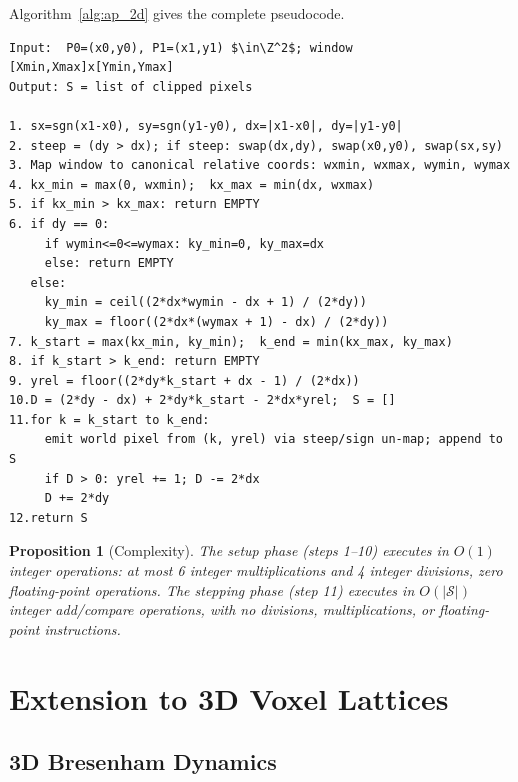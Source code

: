 \documentclass[12pt,a4paper]{article}
\newtheorem{proposition}[theorem]{Proposition}
\theoremstyle{definition}
\newcommand{\Z}{\mathbb{Z}}
\begin{document}
Algorithm~\ref{alg:ap_2d} gives the complete pseudocode.

\begin{algorithm}[tb]
\caption{AP-Bresenham 2D Line Clipping}
\label{alg:ap_2d}
\begin{lstlisting}[style=pseudo,caption={}]
Input:  P0=(x0,y0), P1=(x1,y1) $\in\Z^2$; window [Xmin,Xmax]x[Ymin,Ymax]
Output: S = list of clipped pixels

1. sx=sgn(x1-x0), sy=sgn(y1-y0), dx=|x1-x0|, dy=|y1-y0|
2. steep = (dy > dx); if steep: swap(dx,dy), swap(x0,y0), swap(sx,sy)
3. Map window to canonical relative coords: wxmin, wxmax, wymin, wymax
4. kx_min = max(0, wxmin);  kx_max = min(dx, wxmax)
5. if kx_min > kx_max: return EMPTY
6. if dy == 0:
     if wymin<=0<=wymax: ky_min=0, ky_max=dx
     else: return EMPTY
   else:
     ky_min = ceil((2*dx*wymin - dx + 1) / (2*dy))
     ky_max = floor((2*dx*(wymax + 1) - dx) / (2*dy))
7. k_start = max(kx_min, ky_min);  k_end = min(kx_max, ky_max)
8. if k_start > k_end: return EMPTY
9. yrel = floor((2*dy*k_start + dx - 1) / (2*dx))
10.D = (2*dy - dx) + 2*dy*k_start - 2*dx*yrel;  S = []
11.for k = k_start to k_end:
     emit world pixel from (k, yrel) via steep/sign un-map; append to S
     if D > 0: yrel += 1; D -= 2*dx
     D += 2*dy
12.return S
\end{lstlisting}
\end{algorithm}

\begin{proposition}[Complexity]
The setup phase (steps 1--10) executes in $O(1)$ integer
operations: at most 6 integer multiplications and 4 integer
divisions, zero floating-point operations. The stepping
phase (step 11) executes in $O(|\mathcal{S}|)$ integer
add/compare operations, with no divisions, multiplications,
or floating-point instructions.
\end{proposition}

\section{Extension to 3D Voxel Lattices}
\label{sec:3d}

\subsection{3D Bresenham Dynamics}
\end{document}
